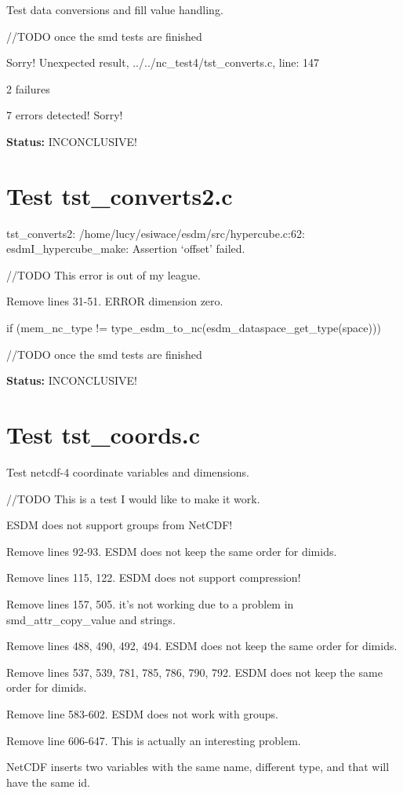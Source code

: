 Test data conversions and fill value handling.

//TODO once the smd tests are finished

Sorry! Unexpected result, ../../nc\_test4/tst\_converts.c, line: 147

2 failures

7 errors detected! Sorry!

{\bf \large Status: } INCONCLUSIVE!

\section{Test tst\_converts2.c}

tst\_converts2: /home/lucy/esiwace/esdm/src/hypercube.c:62: esdmI\_hypercube\_make: Assertion `offset' failed.

//TODO This error is out of my league.

Remove lines 31-51. ERROR dimension zero.

if (mem\_nc\_type != type\_esdm\_to\_nc(esdm\_dataspace\_get\_type(space)))

//TODO once the smd tests are finished

{\bf \large Status: } INCONCLUSIVE!

\section{Test tst\_coords.c}

Test netcdf-4 coordinate variables and dimensions.

//TODO This is a test I would like to make it work.

ESDM does not support groups from NetCDF!

Remove lines 92-93. ESDM does not keep the same order for dimids.

Remove lines 115, 122. ESDM does not support compression!

Remove lines 157, 505. it's not working due to a problem in smd\_attr\_copy\_value and strings.

Remove lines 488, 490, 492, 494. ESDM does not keep the same order for dimids.

Remove lines 537, 539, 781, 785, 786, 790, 792. ESDM does not keep the same order for dimids.

Remove line 583-602. ESDM does not work with groups.

Remove line 606-647. This is actually an interesting problem.

NetCDF inserts two variables with the same name, different type, and that will have the same id.

